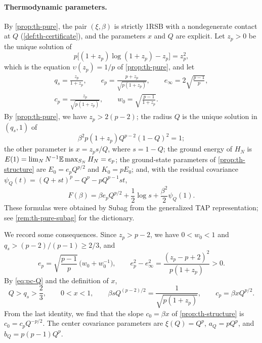 \paragraph{Thermodynamic parameters.}
By \cref{prop:th-pure}, the pair $(\xi,\beta)$ is strictly 1RSB with a nondegenerate contact at $Q$ (\cref{def:th-certificate}), and the parameters $x$ and $Q$ are explicit. Let $z_p>0$ be the unique solution of
\begin{equation}\label{eq:pc-z}
p\big[(1+z_p)\log(1+z_p)-z_p\big]=z_p^2,
\end{equation}
which is the equation $\upsilon(z_p)=1/p$ of \cref{prop:th-pure}, and let
\begin{equation}\label{eq:pc-parameters}
\begin{gathered}
q_s=\frac{z_p}{1+z_p},\qquad e_p=\frac{p+z_p}{\sqrt{p(1+z_p)}},\qquad e_\infty=2\sqrt{\frac{p-1}p},\\
c_p=\frac{z_p}{\sqrt{p(1+z_p)}},\qquad w_0=\sqrt{\frac{p-1}{1+z_p}}.
\end{gathered}
\end{equation}
By \cref{prop:th-pure}, we have $z_p>2(p-2)$; the radius $Q$ is the unique solution in $(q_s,1)$ of
\begin{equation}\label{eq:pc-Q}
\beta^2p(1+z_p)Q^{p-2}(1-Q)^2=1;
\end{equation}
the other parameter is $x=z_ps/Q$, where $s=1-Q$; the ground energy of $H_N$ is $E(1)=\lim_NN^{-1}\mathbb E\max_{S_N}H_N=e_p$; the ground-state parameters of \cref{prop:th-structure} are $E_0=e_pQ^{p/2}$ and $K_0=pE_0$; and, with the residual covariance $\psi_Q(t)=(Q+st)^p-Q^p-pQ^{p-1}st$,
\begin{equation}\label{eq:pc-pressure}
F(\beta)=\beta e_pQ^{p/2}+\frac12\log s+\frac{\beta^2}2\psi_Q(1).
\end{equation}
These formulas were obtained by Subag \cite[Theorems~1 and~2]{Subag2023pure} from the generalized TAP representation; see \cref{rem:th-pure-subag} for the dictionary.

We record some consequences. Since $z_p>p-2$, we have $0<w_0<1$ and $q_s>(p-2)/(p-1)\ge2/3$, and
\begin{equation}\label{eq:pc-gap}
e_p=\sqrt{\frac{p-1}p}\,\bigl(w_0+w_0^{-1}\bigr),\qquad e_p^2-e_\infty^2=\frac{(z_p-p+2)^2}{p(1+z_p)}>0.
\end{equation}
By \eqref{eq:pc-Q} and the definition of $x$,
\begin{equation}\label{eq:pc-Q-range}
Q>q_s>\frac23,\qquad 0<x<1,\qquad \beta sQ^{(p-2)/2}=\frac1{\sqrt{p(1+z_p)}},\qquad c_p=\beta xQ^{p/2}.
\end{equation}
From the last identity, we find that the slope $c_0=\beta x$ of \cref{prop:th-structure} is $c_0=c_pQ^{-p/2}$. The center covariance parameters are $\xi(Q)=Q^p$, $a_Q=pQ^p$, and $b_Q=p(p-1)Q^p$.

